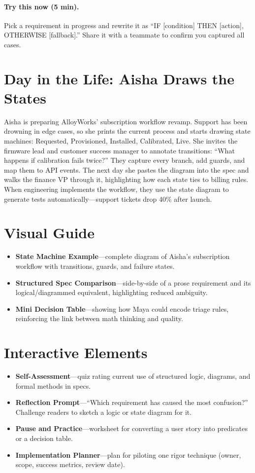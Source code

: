 \paragraph{Try this now (5 min).} Pick a requirement in progress and rewrite it as ``IF [condition] THEN [action], OTHERWISE [fallback].'' Share it with a teammate to confirm you captured all cases.

\section{Day in the Life: Aisha Draws the States}
Aisha is preparing AlloyWorks' subscription workflow revamp. Support has been drowning in edge cases, so she prints the current process and starts drawing state machines: Requested, Provisioned, Installed, Calibrated, Live. She invites the firmware lead and customer success manager to annotate transitions: ``What happens if calibration fails twice?'' They capture every branch, add guards, and map them to API events. The next day she pastes the diagram into the spec and walks the finance VP through it, highlighting how each state ties to billing rules. When engineering implements the workflow, they use the state diagram to generate tests automatically—support tickets drop 40\% after launch.

\section{Visual Guide}
\label{sec:math-visuals}
\begin{itemize}
    \item \textbf{State Machine Example}—complete diagram of Aisha’s subscription workflow with transitions, guards, and failure states.
    \item \textbf{Structured Spec Comparison}—side-by-side of a prose requirement and its logical/diagrammed equivalent, highlighting reduced ambiguity.
    \item \textbf{Mini Decision Table}—showing how Maya could encode triage rules, reinforcing the link between math thinking and quality.
\end{itemize}

\section{Interactive Elements}
\label{sec:math-interactive}
\begin{itemize}
    \item \textbf{Self-Assessment}—quiz rating current use of structured logic, diagrams, and formal methods in specs.
    \item \textbf{Reflection Prompt}—``Which requirement has caused the most confusion?'' Challenge readers to sketch a logic or state diagram for it.
    \item \textbf{Pause and Practice}—worksheet for converting a user story into predicates or a decision table.
    \item \textbf{Implementation Planner}—plan for piloting one rigor technique (owner, scope, success metrics, review date).
\end{itemize}

